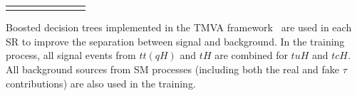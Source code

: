 \begin{table}[t!]
\begin{tabular}{cccccccc}
 \bottomrule\bottomrule\\
 \end{tabular}
\end{table}





Boosted decision trees implemented in the TMVA framework~\cite{Hocker:2007ht} are used in each SR to improve the separation between signal and background. 
In the training process, all signal events from $tt(qH)$ and $tH$ are combined for $tuH$ and $tcH$. All background sources from SM processes
(including both the real and fake $\tau$ contributions) are also used in the training.

